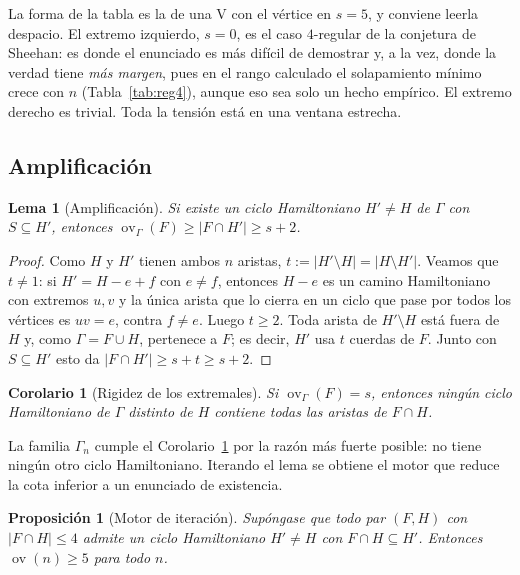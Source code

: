 \documentclass[11pt,a4paper]{article}
\newtheorem{lema}[teorema]{Lema}
\newtheorem{proposicion}[teorema]{Proposición}
\newtheorem{corolario}[teorema]{Corolario}
\theoremstyle{definition}
\theoremstyle{remark}
\newcommand{\ov}{\operatorname{ov}}
\begin{document}
La forma de la tabla es la de una V con el vértice en $s=5$, y conviene leerla despacio. El extremo izquierdo, $s=0$, es el caso $4$-regular de la conjetura de Sheehan: es donde el enunciado es más difícil de demostrar y, a la vez, donde la verdad tiene \emph{más margen}, pues en el rango calculado el solapamiento mínimo crece con $n$ (Tabla~\ref{tab:reg4}), aunque eso sea solo un hecho empírico. El extremo derecho es trivial. Toda la tensión está en una ventana estrecha.

\subsection{Amplificación}

\begin{lema}[Amplificación]\label{lem:amplifica}
Si existe un ciclo Hamiltoniano $H'\ne H$ de $\Gamma$ con $S\subseteq H'$, entonces $\ov_\Gamma(F)\ge|F\cap H'|\ge s+2$.
\end{lema}

\begin{proof}
Como $H$ y $H'$ tienen ambos $n$ aristas, $t:=|H'\setminus H|=|H\setminus H'|$. Veamos que $t\ne1$: si $H'=H-e+f$ con $e\ne f$, entonces $H-e$ es un camino Hamiltoniano con extremos $u,v$ y la única arista que lo cierra en un ciclo que pase por todos los vértices es $uv=e$, contra $f\ne e$. Luego $t\ge2$. Toda arista de $H'\setminus H$ está fuera de $H$ y, como $\Gamma=F\cup H$, pertenece a $F$; es decir, $H'$ usa $t$ cuerdas de $F$. Junto con $S\subseteq H'$ esto da $|F\cap H'|\ge s+t\ge s+2$.
\end{proof}

\begin{corolario}[Rigidez de los extremales]\label{cor:rigidezextr}
Si $\ov_\Gamma(F)=s$, entonces ningún ciclo Hamiltoniano de $\Gamma$ distinto de $H$ contiene todas las aristas de $F\cap H$.
\end{corolario}

La familia $\Gamma_n$ cumple el Corolario~\ref{cor:rigidezextr} por la razón más fuerte posible: no tiene ningún otro ciclo Hamiltoniano. Iterando el lema se obtiene el motor que reduce la cota inferior a un enunciado de existencia.

\begin{proposicion}[Motor de iteración]\label{prop:motor}
Supóngase que todo par $(F,H)$ con $|F\cap H|\le4$ admite un ciclo Hamiltoniano $H'\ne H$ con $F\cap H\subseteq H'$. Entonces $\ov(n)\ge5$ para todo $n$.
\end{proposicion}
\end{document}
